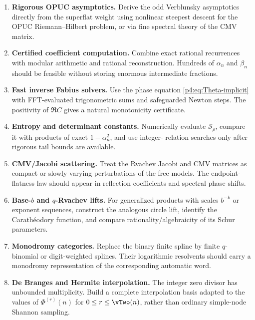 \documentclass[11pt,oneside]{article}
\theoremstyle{definition}
\begin{document}
\begin{enumerate}
\item \textbf{Rigorous OPUC asymptotics.} Derive the odd Verblunsky asymptotics directly from
the superflat weight using nonlinear steepest descent for the OPUC Riemann--Hilbert problem,
or via fine spectral theory of the CMV matrix.

\item \textbf{Certified coefficient computation.} Combine exact rational recurrences with
modular arithmetic and rational reconstruction. Hundreds of \(\alpha_n\) and \(\beta_n\)
should be feasible without storing enormous intermediate fractions.

\item \textbf{Fast inverse Fabius solvers.} Use the phase equation
\eqref{p4:eq:Theta-implicit} with FFT-evaluated trigonometric sums and safeguarded Newton steps.
The positivity of \(\Re C\) gives a natural monotonicity certificate.

\item \textbf{Entropy and determinant constants.} Numerically evaluate
\(\mathcal S_\rho\), compare it with products of exact \(1-\alpha_n^2\), and use integer-
relation searches only after rigorous tail bounds are available.

\item \textbf{CMV/Jacobi scattering.} Treat the Rvachev Jacobi and CMV matrices as compact or
slowly varying perturbations of the free models. The endpoint-flatness law should appear in
reflection coefficients and spectral phase shifts.

\item \textbf{Base-\(b\) and \(q\)-Rvachev lifts.} For generalized products with scales
\(b^{-k}\) or exponent sequences, construct the analogous circle lift, identify the
Carath\'eodory function, and compare rationality/algebraicity of its Schur parameters.

\item \textbf{Monodromy categories.} Replace the binary finite spline by finite
\(q\)-binomial or digit-weighted splines. Their logarithmic resolvents should carry a
monodromy representation of the corresponding automatic word.

\item \textbf{De Branges and Hermite interpolation.} The integer zero divisor has unbounded
multiplicity. Build a complete interpolation basis adapted to the values of
\(\Phi^{(r)}(n)\) for \(0\le r\le\vTwo(n)\), rather than ordinary simple-node Shannon
sampling.


\end{enumerate}
\end{document}
